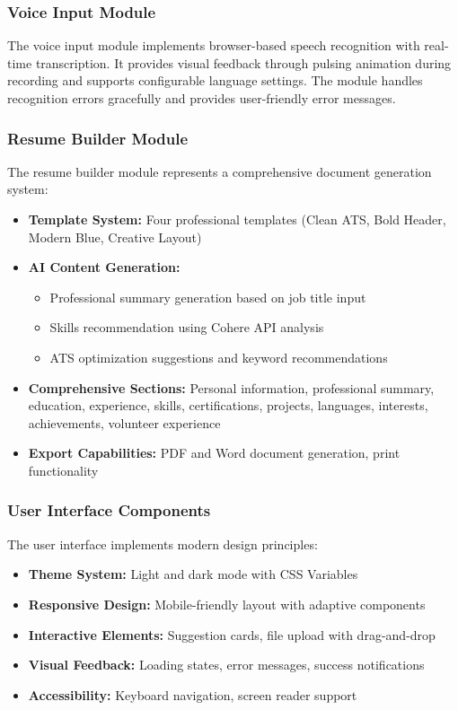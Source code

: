 \documentclass[conference]{IEEEtran}
\begin{document}
\subsubsection{Voice Input Module}
The voice input module implements browser-based speech recognition with real-time transcription. It provides visual feedback through pulsing animation during recording and supports configurable language settings. The module handles recognition errors gracefully and provides user-friendly error messages.

\subsubsection{Resume Builder Module}
The resume builder module represents a comprehensive document generation system:
\begin{itemize}[itemsep=0pt, parsep=0pt, leftmargin=*]
    \item \textbf{Template System:} Four professional templates (Clean ATS, Bold Header, Modern Blue, Creative Layout)
    \item \textbf{AI Content Generation:}
    \begin{itemize}
        \item Professional summary generation based on job title input
        \item Skills recommendation using Cohere API analysis
        \item ATS optimization suggestions and keyword recommendations
    \end{itemize}
    \item \textbf{Comprehensive Sections:} Personal information, professional summary, education, experience, skills, certifications, projects, languages, interests, achievements, volunteer experience
    \item \textbf{Export Capabilities:} PDF and Word document generation, print functionality
\end{itemize}

\subsubsection{User Interface Components}
The user interface implements modern design principles:
\begin{itemize}[itemsep=0pt, parsep=0pt, leftmargin=*]
    \item \textbf{Theme System:} Light and dark mode with CSS Variables
    \item \textbf{Responsive Design:} Mobile-friendly layout with adaptive components
    \item \textbf{Interactive Elements:} Suggestion cards, file upload with drag-and-drop
    \item \textbf{Visual Feedback:} Loading states, error messages, success notifications
    \item \textbf{Accessibility:} Keyboard navigation, screen reader support
\end{itemize}
\end{document}
